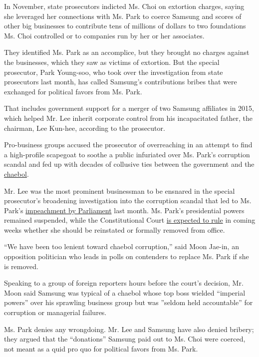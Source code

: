 In November, state prosecutors indicted Ms. Choi on extortion charges,
saying she leveraged her connections with Ms. Park to coerce Samsung and
scores of other big businesses to contribute tens of millions of dollars
to two foundations Ms. Choi controlled or to companies run by her or her
associates.

They identified Ms. Park as an accomplice, but they brought no charges
against the businesses, which they saw as victims of extortion. But the
special prosecutor, Park Young-soo, who took over the investigation from
state prosecutors last month, has called Samsung's contributions bribes
that were exchanged for political favors from Ms. Park.

That includes government support for a merger of two Samsung affiliates
in 2015, which helped Mr. Lee inherit corporate control from his
incapacitated father, the chairman, Lee Kun-hee, according to the
prosecutor.

Pro-business groups accused the prosecutor of overreaching in an attempt
to find a high-profile scapegoat to soothe a public infuriated over Ms.
Park's corruption scandal and fed up with decades of collusive ties
between the government and the
\href{https://www.nytimes3xbfgragh.onion/2017/01/16/business/lee-jae-yong-samsung.html}{chaebol}.

Mr. Lee was the most prominent businessman to be ensnared in the special
prosecutor's broadening investigation into the corruption scandal that
led to Ms. Park's
\href{https://www.nytimes3xbfgragh.onion/2016/12/09/world/asia/south-korea-president-park-geun-hye-impeached.html}{impeachment
by Parliament} last month. Ms. Park's presidential powers remained
suspended, while the Constitutional Court
\href{https://www.nytimes3xbfgragh.onion/2017/01/03/world/asia/south-korea-president-impeachment-trial.html}{is
expected to rule} in coming weeks whether she should be reinstated or
formally removed from office.

``We have been too lenient toward chaebol corruption,'' said Moon
Jae-in, an opposition politician who leads in polls on contenders to
replace Ms. Park if she is removed.

Speaking to a group of foreign reporters hours before the court's
decision, Mr. Moon said Samsung was typical of a chaebol whose top boss
wielded ``imperial powers'' over his sprawling business group but was
''seldom held accountable'' for corruption or managerial failures.

Ms. Park denies any wrongdoing. Mr. Lee and Samsung have also denied
bribery; they argued that the ``donations'' Samsung paid out to Ms. Choi
were coerced, not meant as a quid pro quo for political favors from Ms.
Park.

